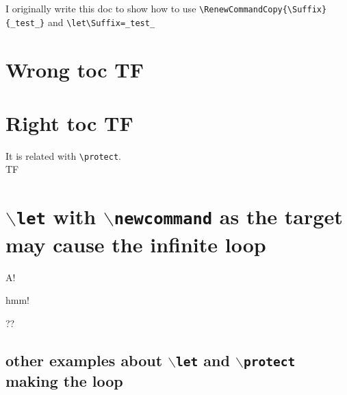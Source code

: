 \documentclass{article}
\begin{document}
\newcommand\foo[1]{\def\arg{#1}\ifx\arg\empty T\else F\fi}
\tableofcontents
\newpage
I originally write this doc to show how to use \verb|\RenewCommandCopy{\Suffix}{_test_}| 
and \verb|\let\Suffix=_test_|

\section{Wrong toc \foo{}} %
\section{Right toc \protect\foo{}} %
It is related with \verb|\protect|.\\
\foo{}

\section{\texttt{$\backslash$let} with \texttt{$\backslash$newcommand} as the target
may cause the infinite loop}
\newcommand\x[1][hmm]{#1!}
\x[A]

\NewCommandCopy\originalx\x

\renewcommand\x[1][oops]{\originalx[#1] ??}

\x[B]

\subsection{other examples about \texttt{$\backslash$let} 
and \texttt{$\backslash$protect} making the loop}
\end{document}
